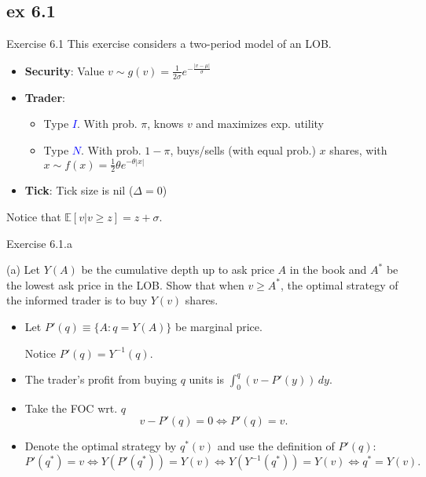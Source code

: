 \documentclass[english,10pt
,aspectratio=169
]{beamer}
\begin{document}
\subsection{ex 6.1}

\begin{frame}[label=ex1]{Exercise 6.1}
	This exercise considers a two-period model of an LOB.
	\begin{itemize}
		\item \textbf{Security}: Value $v \sim g(v)=\frac{1}{2\sigma} e^{-\frac{|v-\mu|}{\sigma}}$
		\item \textbf{Trader}: 
		\begin{itemize}
			\item Type \textcolor{blue}{$I$}. With prob. $\pi$, knows $v$ and maximizes exp. utility
			\item Type \textcolor{blue}{$N$}. With prob. $1-\pi$, buys/sells (with equal prob.) $x$ shares, with $x \sim f(x)=\frac{1}{2}\theta e^{-\theta |x|}$ 
		\end{itemize}
		\item \textbf{Tick}: Tick size is nil ($\Delta=0$)
	\end{itemize}
	Notice that $\mathbb{E}[v|v \ge z]=z+\sigma$.
\end{frame}


\begin{frame}{Exercise 6.1.a}
	\begin{exampleblock}{}
		(a) Let $Y(A)$ be the cumulative depth up to ask price $A$ in the book and $A^*$ be the lowest ask price in the LOB. Show that when $v \ge A^*$, the optimal strategy of the informed trader is to buy $Y(v)$ shares.
	\end{exampleblock}

	\pause

	\begin{itemize}
		\item Let $P'(q) \equiv \{A: q=Y(A)\}$ be marginal price.
		
		Notice $P'(q) = Y^{-1}(q)$.
		\item The trader's profit from buying $q$ units is $\int_0^q (v-P'(y)) \, dy.$
		\item Take the FOC wrt. $q$
		\[
		v-P'(q)=0 \Leftrightarrow P'(q)=v.
		\]
		\item Denote the optimal strategy by $q^*(v)$ and use the definition of $P'(q)$:
		\[
		P'(q^*)=v \Leftrightarrow Y(P'(q^*))=Y(v) \Leftrightarrow Y(Y^{-1}(q^*))=Y(v) \Leftrightarrow q^*= Y(v).
		\]
	\end{itemize}
\end{frame}
\end{document}
